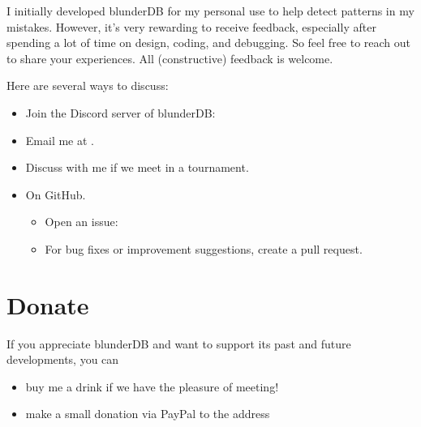 \documentclass[letterpaper,10pt,english]{sphinxmanual}
\begin{document}
\sphinxAtStartPar
I initially developed blunderDB for my personal use to help detect patterns in my mistakes. However, it’s very rewarding to receive feedback, especially after spending a lot of time on design, coding, and debugging. So feel free to reach out to share your experiences. All (constructive) feedback is welcome.

\sphinxAtStartPar
Here are several ways to discuss:
\begin{itemize}
\item {} 
\sphinxAtStartPar
Join the Discord server of blunderDB: 

\item {} 
\sphinxAtStartPar
Email me at .

\item {} 
\sphinxAtStartPar
Discuss with me if we meet in a tournament.

\item {} 
\sphinxAtStartPar
On GitHub.
\begin{itemize}
\item {} 
\sphinxAtStartPar
Open an issue: 

\item {} 
\sphinxAtStartPar
For bug fixes or improvement suggestions, create a pull request.

\end{itemize}

\end{itemize}


\chapter{Donate}
\label{\detokenize{index:faire-un-don}}
\sphinxAtStartPar
If you appreciate blunderDB and want to support its past and future developments, you can
\begin{itemize}
\item {} 
\sphinxAtStartPar
buy me a drink if we have the pleasure of meeting!

\item {} 
\sphinxAtStartPar
make a small donation via PayPal to the address 

\end{itemize}
\end{document}
